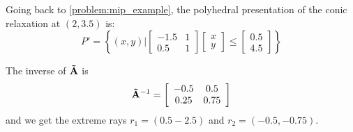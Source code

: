 \newpage
Going back to \cref{problem:mip_example}, the polyhedral presentation of the conic relaxation at $(2, 3.5)$ is:
\begin{equation*}
    P' =     
    \left\{ (x,y) \Bigg|
        \left[ \begin{array}{cc}
            -1.5 & 1 \\
            0.5 & 1
        \end{array}\right]
        \left[ \begin{array}{c}
            x \\ y
        \end{array} \right] \leq
        \left[ \begin{array}{c}
            0.5 \\ 4.5
        \end{array} \right] 
    \right\}
\end{equation*}

The inverse of $\bold{\tilde A}$ is 
\begin{equation*}
    \bold{\tilde A}^{-1} =     
        \left[ \begin{array}{cc}
            -0.5 & 0.5 \\
            0.25 & 0.75
        \end{array}\right]
\end{equation*}
and we get the extreme rays $r_1 = (0.5 -2.5)$ and $r_2= (-0.5, -0.75)$.

